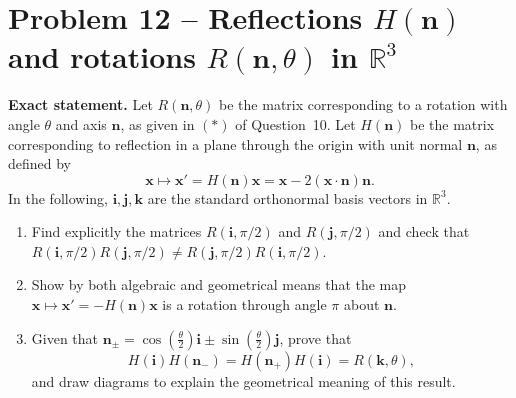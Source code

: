 \documentclass[12pt,a4paper]{article}
\theoremstyle{plain}
\theoremstyle{definition}      %
\begin{document}
\section*{Problem 12 -- Reflections $H(\mathbf n)$ and rotations $R(\mathbf n,\theta)$ in $\mathbb R^3$}

\textbf{Exact statement.}
Let $R(\mathbf n,\theta)$ be the matrix corresponding to a rotation with angle $\theta$ and axis $\mathbf n$, as given in $(*)$ of Question~10.
Let $H(\mathbf n)$ be the matrix corresponding to reflection in a plane through the origin with unit normal $\mathbf n$, as defined by
\[
\mathbf x\mapsto \mathbf x'=H(\mathbf n)\mathbf x=\mathbf x-2(\mathbf x\cdot\mathbf n)\mathbf n.
\]
In the following, $\mathbf i,\mathbf j,\mathbf k$ are the standard orthonormal basis vectors in $\mathbb R^3$.
\begin{enumerate}[label=(\alph*)]
	\item Find explicitly the matrices $R(\mathbf i,\pi/2)$ and $R(\mathbf j,\pi/2)$ and check that
	$R(\mathbf i,\pi/2)R(\mathbf j,\pi/2)\neq R(\mathbf j,\pi/2)R(\mathbf i,\pi/2)$.
	\item Show by both algebraic and geometrical means that the map $\mathbf x\mapsto \mathbf x'=-H(\mathbf n)\mathbf x$ is a rotation through angle $\pi$ about $\mathbf n$.
	\item Given that $\mathbf n_\pm=\cos(\tfrac{\theta}{2})\mathbf i \pm \sin(\tfrac{\theta}{2})\mathbf j$, prove that
	\[
	H(\mathbf i)H(\mathbf n_-)=H(\mathbf n_+)H(\mathbf i)=R(\mathbf k,\theta),
	\]
	and draw diagrams to explain the geometrical meaning of this result.
\end{enumerate}
\end{document}
